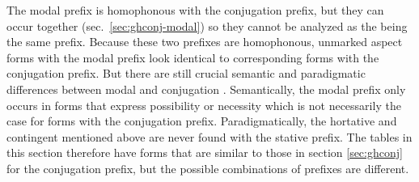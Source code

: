 \begin{multicols}{2}
The  modal prefix is homophonous with the  conjugation prefix, but they can occur together (sec.\ \ref{sec:ghconj-modal}) so they cannot be analyzed as the being the same prefix.
Because these two prefixes are homophonous, unmarked aspect forms with the  modal prefix look identical to corresponding forms with the  conjugation prefix.
But there are still crucial semantic and paradigmatic differences between modal  and conjugation .
Semantically, the  modal prefix only occurs in forms that express possibility or necessity which is not necessarily the case for forms with the  conjugation prefix.
Paradigmatically, the hortative and contingent mentioned above are never found with the  stative prefix.
The tables in this section therefore have forms that are similar to those in section \ref{sec:ghconj} for the  conjugation prefix, but the possible combinations of prefixes are different.
\end{multicols}

